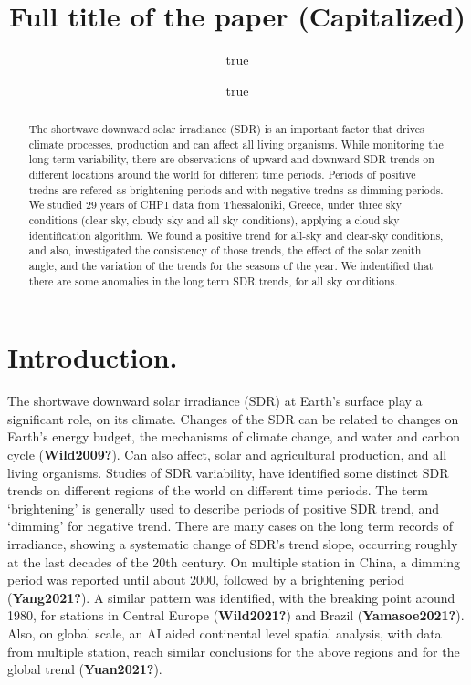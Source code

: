 \documentclass[
]{article}
\title{Full title of the paper (Capitalized)}
\author{true \and true}
\date{}
\begin{document}
\maketitle
\begin{abstract}
The shortwave downward solar irradiance (SDR) is an important factor that drives climate processes, production and can affect all living organisms.
While monitoring the long term variability, there are observations of upward and downward SDR trends on different locations around the world for different time periods.
Periods of positive tredns are refered as brightening periods and with negative tredns as dimming periods.
We studied 29 years of CHP1 data from Thessaloniki, Greece, under three sky conditions (clear sky, cloudy sky and all sky conditions), applying a cloud sky identification algorithm.
We found a positive trend for all-sky and clear-sky conditions, and also, investigated the consistency of those trends, the effect of the solar zenith angle, and the variation of the trends for the seasons of the year.
We indentified that there are some anomalies in the long term SDR trends, for all sky conditions.
\end{abstract}

{
\setcounter{tocdepth}{2}
\tableofcontents
}
\hypertarget{introduction.}{%
\section{Introduction.}\label{introduction.}}

The shortwave downward solar irradiance (SDR) at Earth's surface play a significant role, on its climate.
Changes of the SDR can be related to changes on Earth's energy budget, the mechanisms of climate change, and water and carbon cycle (\textbf{Wild2009?}).
Can also affect, solar and agricultural production, and all living organisms.
Studies of SDR variability, have identified some distinct SDR trends on different regions of the world on different time periods.
The term `brightening' is generally used to describe periods of positive SDR trend, and `dimming' for negative trend.
There are many cases on the long term records of irradiance, showing a systematic change of SDR's trend slope, occurring roughly at the last decades of the 20th century.
On multiple station in China, a dimming period was reported until about 2000, followed by a brightening period (\textbf{Yang2021?}).
A similar pattern was identified, with the breaking point around 1980, for stations in Central Europe (\textbf{Wild2021?}) and Brazil (\textbf{Yamasoe2021?}).
Also, on global scale, an AI aided continental level spatial analysis, with data from multiple station, reach similar conclusions for the above regions and for the global trend (\textbf{Yuan2021?}).
\end{document}
